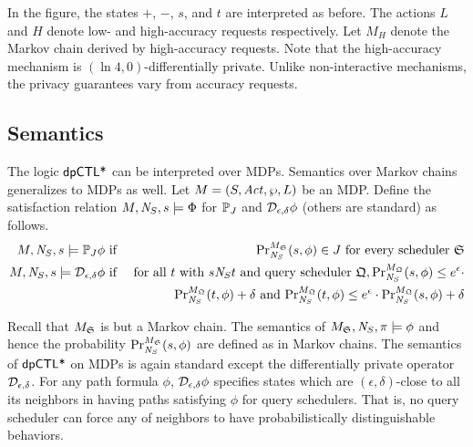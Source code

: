 In the figure, the states $+$,
$-$, $s$, and $t$ are interpreted as before. The actions $L$ and $H$
denote low- and high-accuracy requests respectively. Let $M_H$ denote
the Markov chain derived by high-accuracy requests.
Note that the high-accuracy mechanism is $(\ln 4,0)$-differentially private.
Unlike non-interactive mechanisms, the privacy guarantees vary from accuracy requests.

\subsection{Semantics}
The logic $\dpCTLstar$ can be interpreted over MDPs. Semantics over Markov chains generalizes to MDPs as well. %
Let $M = (S, \Act, \wp, L)$ be an MDP. Define the satisfaction
relation $M, \neighbor{S}, s \models \Phi$ for $\PJ{J}$ and $\dpriv{\epsilon}{\delta} \phi$ (others are standard) as follows.
\begin{eqnarray*}
  M, \neighbor{S}, s \models \PJ{J} \phi
  & \textmd{ if } &
  \myPr{s}{M_{\scheduler{S}}}{\neighbor{S}}{\phi} \in J
  \textmd{ for every scheduler } \scheduler{S}\\
  M, \neighbor{S}, s \models \dpriv{\epsilon}{\delta} \phi
  & \textmd{ if } &
  \textmd{for all } t \textmd{ with } s \neighbor{S} t \textmd{ and
   query scheduler } \scheduler{Q},
   \myPr{s}{M_{\scheduler{Q}}}{\neighbor{S}}{\phi} \leq
  e^{\epsilon} \cdot
   \\
  & &
   \myPr{t}{M_{\scheduler{Q}}}{\neighbor{S}}{\phi} + \delta
   \textmd{ and }
   \myPr{t}{M_{\scheduler{Q}}}{\neighbor{S}}{\phi} \leq e^{\epsilon} \cdot
   \myPr{s}{M_{\scheduler{Q}}}{\neighbor{S}}{\phi} + \delta
\end{eqnarray*}

Recall that $M_{\scheduler{S}}$ is but a Markov chain. The semantics
of $M_{\scheduler{S}}, \neighbor{S}, \pi \models \phi$ and hence the
probability $\myPr{s}{M_{\scheduler{S}}}{\neighbor{S}}{\phi}$ are
defined as in Markov chains.
The semantics of $\dpCTLstar$ on MDPs
is again standard except the differentially private operator
$\dpriv{\epsilon}{\delta}$. For any path formula $\phi$,
$\dpriv{\epsilon}{\delta} \phi$ specifies states which are $(\epsilon,
\delta)$-close to all its neighbors in having paths satisfying $\phi$
for query schedulers. That is, no
query scheduler can force any of neighbors to have
probabilistically distinguishable behaviors.

